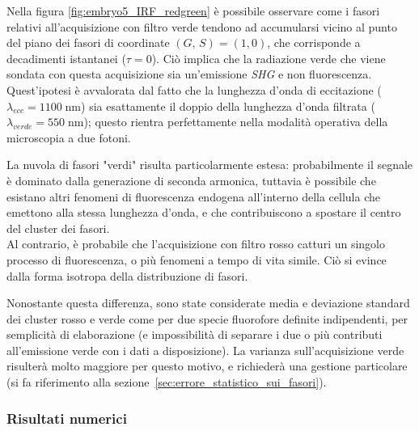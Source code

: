

Nella figura \ref{fig:embryo5_IRF_redgreen} è possibile osservare come i fasori relativi all'acquisizione con filtro verde tendono ad accumularsi vicino al punto del piano dei fasori di coordinate $(G,\, S)=(1, 0)$, che corrisponde a decadimenti istantanei ($\tau=0$). Ciò implica che la radiazione verde che viene sondata con questa acquisizione sia un'emissione \textit{SHG} e non fluorescenza.\\
Quest'ipotesi è avvalorata dal fatto che la lunghezza d'onda di eccitazione ($\lambda_{ecc}= 1100\;\text{nm}$) sia esattamente il doppio della lunghezza d'onda filtrata ($\lambda_{verde}= 550\;\text{nm}$); questo rientra perfettamente nella modalità operativa della microscopia a due fotoni.


La nuvola di fasori "verdi" risulta particolarmente estesa: probabilmente il segnale è dominato dalla generazione di seconda armonica, tuttavia è possibile che esistano altri fenomeni di fluorescenza endogena all'interno della cellula che emettono alla stessa lunghezza d'onda, e che contribuiscono a spostare il centro del cluster dei fasori.\\
Al contrario, è probabile che l'acquisizione con filtro rosso catturi un singolo processo di fluorescenza, o più fenomeni a tempo di vita simile. Ciò si evince dalla forma isotropa della distribuzione di fasori.

Nonostante questa differenza, sono state considerate media e deviazione standard dei cluster rosso e verde come per due specie fluorofore definite indipendenti, per semplicità di elaborazione (e impossibilità di separare i due o più contributi all'emissione verde con i dati a disposizione). La varianza sull'acquisizione verde risulterà molto maggiore per questo motivo, e richiederà una gestione particolare (si fa riferimento alla sezione~\ref{sec:errore_statistico_sui_fasori}). 



\subsubsection{Risultati numerici}

